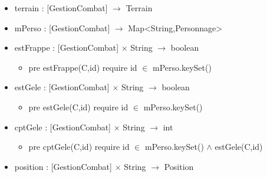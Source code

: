 \documentclass[11pt]{article}
\begin{document}
\begin{itemize}

\item terrain : [GestionCombat] $\to$ Terrain\\
\label{sec-1.4.1.1}



\item mPerso : [GestionCombat] $\to$ Map<String,Personnage>\\
\label{sec-1.4.1.2}



\item estFrappe : [GestionCombat] $\times$ String $\to$ boolean\\
\label{sec-1.4.1.3}

\begin{itemize}

\item pre estFrappe(C,id) require id $\in$ mPerso.keySet()\\
\label{sec-1.4.1.3.1}


\end{itemize} %

\item estGele : [GestionCombat] $\times$ String $\to$ boolean\\
\label{sec-1.4.1.4}

\begin{itemize}

\item pre estGele(C,id) require id $\in$ mPerso.keySet()\\
\label{sec-1.4.1.4.1}


\end{itemize} %

\item cptGele : [GestionCombat] $\times$ String $\to$ int\\
\label{sec-1.4.1.5}

\begin{itemize}

\item pre cptGele(C,id) require id $\in$ mPerso.keySet() $\wedge$ estGele(C,id)\\
\label{sec-1.4.1.5.1}


\end{itemize} %

\item position : [GestionCombat] $\times$ String $\to$ Position\\
\label{sec-1.4.1.6}


\end{itemize}
\end{document}
